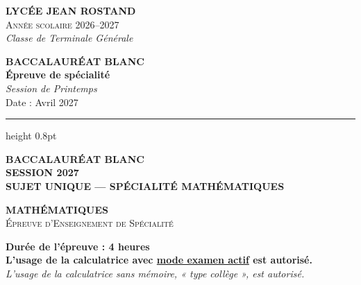 \documentclass[12pt,a4paper]{article}
\begin{document}
\thispagestyle{empty}


\noindent
\begin{minipage}[t]{0.52\textwidth}
    \textbf{\Large LYCÉE JEAN ROSTAND}\\[0.12cm]
    \textsc{Année scolaire 2026--2027}\\
    \textit{Classe de Terminale Générale}
\end{minipage}
\hfill
\begin{minipage}[t]{0.45\textwidth}
    \raggedleft
    \textbf{\large BACCALAURÉAT BLANC}\\[0.10cm]
    \textbf{Épreuve de spécialité}\\[0.10cm]
    \textit{Session de Printemps}\\[0.12cm]
    \small Date : Avril 2027
\end{minipage}

\vspace{0.30cm}
\hrule height 0.8pt
\vspace{0.45cm}

\vfill

\begin{center}
    {\LARGE \textbf{BACCALAURÉAT BLANC}}\\[0.20cm]
    {\large \textbf{SESSION 2027}}\\[0.15cm]
    {\textbf{\Large SUJET UNIQUE --- SPÉCIALITÉ MATHÉMATIQUES}}\\[0.45cm]

    \begin{tcolorbox}[colback=white, colframe=black, arc=0mm, boxrule=1.5pt, width=0.96\textwidth, top=4mm, bottom=4mm]
        \centering
        {\fontsize{26pt}{30pt}\selectfont\textbf{MATHÉMATIQUES}}\\[0.30cm]
        {\Large \textsc{Épreuve d'Enseignement de Spécialité}}
    \end{tcolorbox}

    \vspace{0.50cm}
    {\large \textbf{Durée de l'épreuve : 4 heures}}\\[0.25cm]
    \textbf{L'usage de la calculatrice avec \underline{mode examen actif} est autorisé.}\\[0.10cm]
    \textit{L'usage de la calculatrice sans mémoire, « type collège », est autorisé.}
\end{center}
\end{document}
